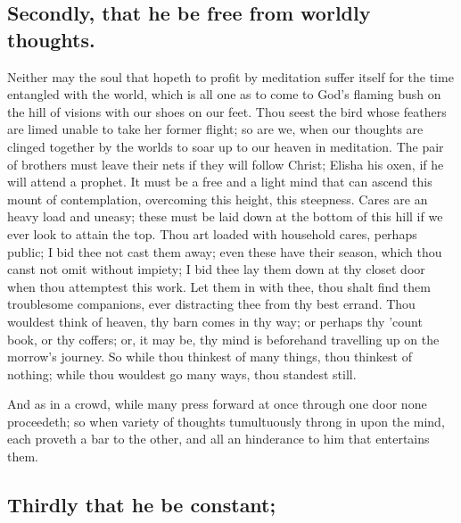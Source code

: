 \subsection{Secondly, that he be free from worldly thoughts.}

Neither may the soul that hopeth to profit by meditation suffer itself for the time entangled with the world, which is all one as to come to God's flaming bush on the hill of visions with our shoes on our feet. Thou seest the bird whose feathers are limed unable to take her former flight; so are we, when our thoughts are clinged together by the worlds to soar up to our heaven in meditation. The pair of brothers must leave their nets if they will follow Christ; Elisha his oxen, if he will attend a prophet. It must be a free and a light mind that can ascend this mount of contemplation, overcoming this height, this steepness. Cares are an heavy load and uneasy; these must be laid down at the bottom of this hill if we ever look to attain the top. Thou art loaded with household cares, perhaps public; I bid thee not cast them away; even these have their season, which thou canst not omit without impiety; I bid thee lay them down at thy closet door when thou attemptest this work. Let them in with thee, thou shalt find them troublesome companions, ever distracting thee from thy best errand. Thou wouldest think of heaven, thy barn comes in thy way; or perhaps thy 'count book, or thy coffers; or, it may be, thy mind is beforehand travelling up on the morrow's journey. So while thou thinkest of many things, thou thinkest of nothing; while thou wouldest go many ways, thou standest still. 

And as in a crowd, while many press forward at once through one door none proceedeth; so when variety of thoughts tumultuously throng in upon the mind, each proveth a bar to the other, and all an hinderance to him that entertains them.

\subsection{Thirdly that he be constant;}
